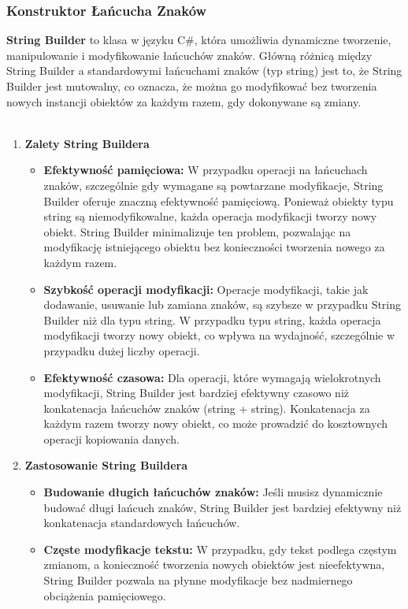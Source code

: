 \subsubsection{Konstruktor Łańcucha Znaków}
\textbf{String Builder} to klasa w języku C\#, która umożliwia dynamiczne tworzenie, manipulowanie i modyfikowanie łańcuchów znaków. Główną różnicą między String Builder a standardowymi łańcuchami znaków (typ string) jest to, że String Builder jest mutowalny, co oznacza, że można go modyfikować bez tworzenia nowych instancji obiektów za każdym razem, gdy dokonywane są zmiany. \\ \\
\begin{enumerate}
    \item \textbf{Zalety String Buildera}
        \begin{itemize}
        \item \textbf{Efektywność pamięciowa:} W przypadku operacji na łańcuchach znaków, szczególnie gdy wymagane są powtarzane modyfikacje, String Builder oferuje znaczną efektywność pamięciową. Ponieważ obiekty typu string są niemodyfikowalne, każda operacja modyfikacji tworzy nowy obiekt. String Builder minimalizuje ten problem, pozwalając na modyfikację istniejącego obiektu bez konieczności tworzenia nowego za każdym razem.
        \item \textbf{Szybkość operacji modyfikacji:} Operacje modyfikacji, takie jak dodawanie, usuwanie lub zamiana znaków, są szybsze w przypadku String Builder niż dla typu string. W przypadku typu string, każda operacja modyfikacji tworzy nowy obiekt, co wpływa na wydajność, szczególnie w przypadku dużej liczby operacji.
        \item \textbf{Efektywność czasowa:} Dla operacji, które wymagają wielokrotnych modyfikacji, String Builder jest bardziej efektywny czasowo niż konkatenacja łańcuchów znaków (string + string). Konkatenacja za każdym razem tworzy nowy obiekt, co może prowadzić do kosztownych operacji kopiowania danych.
        \end{itemize}
    \item \textbf{Zastosowanie String Buildera}
        \begin{itemize}
        \item \textbf{Budowanie długich łańcuchów znaków:} Jeśli musisz dynamicznie budować długi łańcuch znaków, String Builder jest bardziej efektywny niż konkatenacja standardowych łańcuchów.
        \item \textbf{Częste modyfikacje tekstu:} W przypadku, gdy tekst podlega częstym zmianom, a konieczność tworzenia nowych obiektów jest nieefektywna, String Builder pozwala na płynne modyfikacje bez nadmiernego obciążenia pamięciowego.

\end{itemize}
\end{enumerate}
